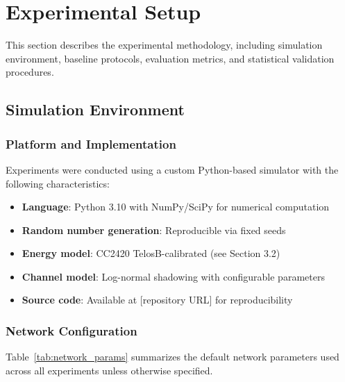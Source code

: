 
\section{Experimental Setup}
\label{sec:experiments}

This section describes the experimental methodology, including simulation
environment, baseline protocols, evaluation metrics, and statistical
validation procedures.

\subsection{Simulation Environment}

\subsubsection{Platform and Implementation}

Experiments were conducted using a custom Python-based simulator with the
following characteristics:

\begin{itemize}
    \item \textbf{Language}: Python 3.10 with NumPy/SciPy for numerical
    computation
    \item \textbf{Random number generation}: Reproducible via fixed seeds
    \item \textbf{Energy model}: CC2420 TelosB-calibrated (see Section 3.2)
    \item \textbf{Channel model}: Log-normal shadowing with configurable
    parameters
    \item \textbf{Source code}: Available at [repository URL] for
    reproducibility
\end{itemize}

\subsubsection{Network Configuration}

Table~\ref{tab:network_params} summarizes the default network parameters
used across all experiments unless otherwise specified.

